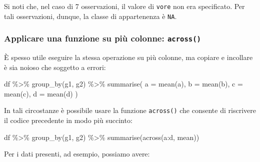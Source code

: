 \documentclass[
  11pt,
]{krantz}
\makeatletter
\newenvironment{Shaded}{\begin{snugshade}}{\end{snugshade}}
\newcommand{\AttributeTok}[1]{\textcolor[rgb]{0.61,0.61,0.61}{#1}}
\newcommand{\FunctionTok}[1]{\textcolor[rgb]{0,0,0}{#1}}
\newcommand{\NormalTok}[1]{#1}
\newcommand{\SpecialCharTok}[1]{\textcolor[rgb]{0,0,0}{#1}}
\newenvironment{kframe}{%
\medskip{}
\setlength{\fboxsep}{.8em}
 \def\at@end@of@kframe{}%
 \ifinner\ifhmode%
  \def\at@end@of@kframe{\end{minipage}}%
  \begin{minipage}{\columnwidth}%
 \fi\fi%
 \def\FrameCommand##1{\hskip\@totalleftmargin \hskip-\fboxsep
 \colorbox{shadecolor}{##1}\hskip-\fboxsep
     \hskip-\linewidth \hskip-\@totalleftmargin \hskip\columnwidth}%
 \MakeFramed {\advance\hsize-\width
   \@totalleftmargin\z@ \linewidth\hsize
   \@setminipage}}%
 {\par\unskip\endMakeFramed%
 \at@end@of@kframe}
\renewenvironment{Shaded}{\begin{kframe}}{\end{kframe}}
\theoremstyle{definition}
\theoremstyle{definition}
\theoremstyle{definition}
\theoremstyle{definition}
\theoremstyle{remark}
\makeatother
\begin{document}
\noindent Si noti che, nel caso di 7 osservazioni, il valore di \texttt{vore} non era specificato. Per tali osservazioni, dunque, la classe di appartenenza è \texttt{NA}.

\hypertarget{applicare-una-funzione-su-piuxf9-colonne-across}{%
\subsubsection{\texorpdfstring{Applicare una funzione su più colonne: \texttt{across()}}{Applicare una funzione su più colonne: across()}}\label{applicare-una-funzione-su-piuxf9-colonne-across}}

È spesso utile eseguire la stessa operazione su più colonne, ma copiare e incollare è sia noioso che soggetto a errori:

\begin{Shaded}
\begin{Highlighting}[]
\NormalTok{df }\SpecialCharTok{\%\textgreater{}\%}
  \FunctionTok{group\_by}\NormalTok{(g1, g2) }\SpecialCharTok{\%\textgreater{}\%}
  \FunctionTok{summarise}\NormalTok{(}
    \AttributeTok{a =} \FunctionTok{mean}\NormalTok{(a),}
    \AttributeTok{b =} \FunctionTok{mean}\NormalTok{(b),}
    \AttributeTok{c =} \FunctionTok{mean}\NormalTok{(c),}
    \AttributeTok{d =} \FunctionTok{mean}\NormalTok{(d)}
\NormalTok{  )}
\end{Highlighting}
\end{Shaded}

\noindent In tali circostanze è possibile usare la funzione \texttt{across()} che consente di riscrivere il codice precedente in modo più succinto:

\begin{Shaded}
\begin{Highlighting}[]
\NormalTok{df }\SpecialCharTok{\%\textgreater{}\%} 
  \FunctionTok{group\_by}\NormalTok{(g1, g2) }\SpecialCharTok{\%\textgreater{}\%} 
  \FunctionTok{summarise}\NormalTok{(}\FunctionTok{across}\NormalTok{(a}\SpecialCharTok{:}\NormalTok{d, mean))}
\end{Highlighting}
\end{Shaded}

\noindent Per i dati presenti, ad esempio, possiamo avere:
\end{document}

